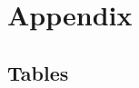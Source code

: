 \printbibliography
\newpage

\appendix
\noindent
\section{Appendix}






\setcounter{table}{0}
\renewcommand{\thetable}{A\arabic{table}}
\subsection*{Tables}

